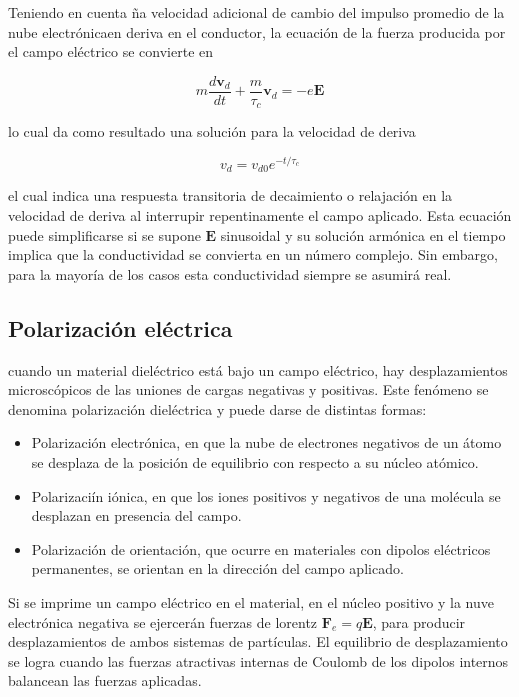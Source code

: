 Teniendo en cuenta ña velocidad adicional de cambio del impulso promedio de la nube electrónicaen deriva en el conductor, la ecuación de la fuerza producida por el campo eléctrico se convierte en

\begin{equation*}
m \frac{d \mathbf{v}_d}{d t} + \frac{m}{\tau_c} \mathbf{v}_d = -e \mathbf{E}
\end{equation*}

lo cual da como resultado una solución para la velocidad de deriva 

\begin{equation*}
v_d = v_{d0} e^{-t/\tau_c}
\end{equation*}

el cual indica una respuesta transitoria de decaimiento o relajación en la velocidad de deriva al interrupir repentinamente el campo aplicado. Esta ecuación puede simplificarse si se supone $\mathbf{E}$ sinusoidal y su solución armónica en el tiempo implica que la conductividad se convierta en un número complejo. Sin embargo, para la mayoría de los casos esta conductividad siempre se asumirá real.


\subsection{Polarización eléctrica}

cuando un material dieléctrico está bajo un campo eléctrico, hay desplazamientos microscópicos de las uniones de cargas negativas y positivas. Este fenómeno se denomina polarización dieléctrica y puede darse de distintas formas:

\begin{itemize}
    \item Polarización electrónica, en que la nube de electrones negativos de un átomo se desplaza de la posición de equilibrio con respecto a su núcleo atómico.
    \item Polarizaciín iónica, en que los iones positivos y negativos de una molécula se desplazan en presencia del campo.
    \item Polarización de orientación, que ocurre en materiales con dipolos eléctricos permanentes, se orientan en la dirección del campo aplicado.
\end{itemize}

Si se imprime un campo eléctrico en el material, en el núcleo positivo y la nuve electrónica negativa se ejercerán fuerzas de lorentz $\mathbf{F}_e = q \mathbf{E}$, para producir desplazamientos de ambos sistemas de partículas. El equilibrio de desplazamiento se logra cuando las fuerzas atractivas internas de Coulomb de los dipolos internos balancean las fuerzas aplicadas.


